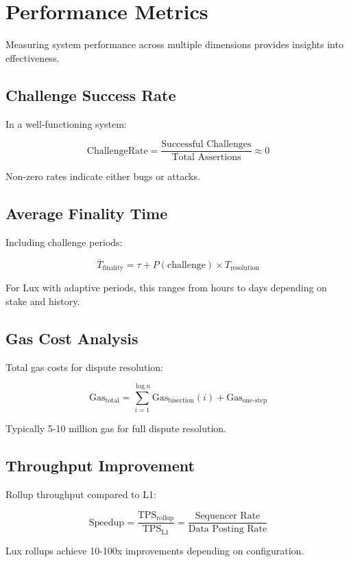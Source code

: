 \section{Performance Metrics}


Measuring system performance across multiple dimensions provides insights into effectiveness.

\subsection{Challenge Success Rate}

In a well-functioning system:

\begin{equation}
\text{ChallengeRate} = \frac{\text{Successful Challenges}}{\text{Total Assertions}} \approx 0
\end{equation}

Non-zero rates indicate either bugs or attacks.

\subsection{Average Finality Time}

Including challenge periods:

\begin{equation}
\bar{T}_{\text{finality}} = \tau + P(\text{challenge}) \times T_{\text{resolution}}
\end{equation}

For Lux with adaptive periods, this ranges from hours to days depending on stake and history.

\subsection{Gas Cost Analysis}

Total gas costs for dispute resolution:

\begin{equation}
\text{Gas}_{\text{total}} = \sum_{i=1}^{\log n} \text{Gas}_{\text{bisection}}(i) + \text{Gas}_{\text{one-step}}
\end{equation}

Typically 5-10 million gas for full dispute resolution.

\subsection{Throughput Improvement}

Rollup throughput compared to L1:

\begin{equation}
\text{Speedup} = \frac{\text{TPS}_{\text{rollup}}}{\text{TPS}_{\text{L1}}} = \frac{\text{Sequencer Rate}}{\text{Data Posting Rate}}
\end{equation}

Lux rollups achieve 10-100x improvements depending on configuration.

